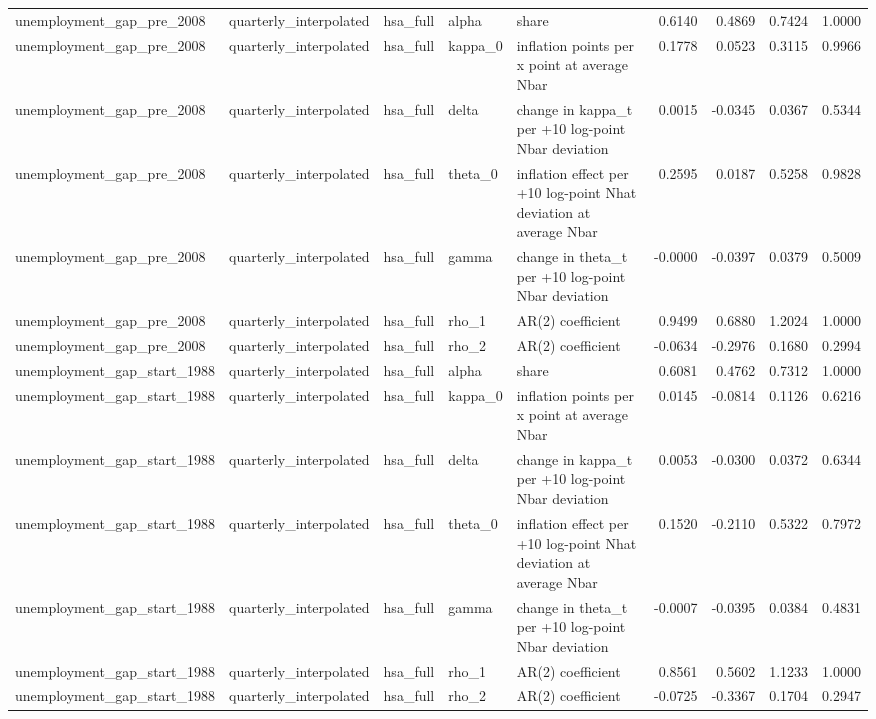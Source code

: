 \begin{tabular}{lllllrrrr}
unemployment\_gap\_pre\_2008 & quarterly\_interpolated & hsa\_full & alpha & share & 0.6140 & 0.4869 & 0.7424 & 1.0000 \\
unemployment\_gap\_pre\_2008 & quarterly\_interpolated & hsa\_full & kappa\_0 & inflation points per x point at average Nbar & 0.1778 & 0.0523 & 0.3115 & 0.9966 \\
unemployment\_gap\_pre\_2008 & quarterly\_interpolated & hsa\_full & delta & change in kappa\_t per +10 log-point Nbar deviation & 0.0015 & -0.0345 & 0.0367 & 0.5344 \\
unemployment\_gap\_pre\_2008 & quarterly\_interpolated & hsa\_full & theta\_0 & inflation effect per +10 log-point Nhat deviation at average Nbar & 0.2595 & 0.0187 & 0.5258 & 0.9828 \\
unemployment\_gap\_pre\_2008 & quarterly\_interpolated & hsa\_full & gamma & change in theta\_t per +10 log-point Nbar deviation & -0.0000 & -0.0397 & 0.0379 & 0.5009 \\
unemployment\_gap\_pre\_2008 & quarterly\_interpolated & hsa\_full & rho\_1 & AR(2) coefficient & 0.9499 & 0.6880 & 1.2024 & 1.0000 \\
unemployment\_gap\_pre\_2008 & quarterly\_interpolated & hsa\_full & rho\_2 & AR(2) coefficient & -0.0634 & -0.2976 & 0.1680 & 0.2994 \\
unemployment\_gap\_start\_1988 & quarterly\_interpolated & hsa\_full & alpha & share & 0.6081 & 0.4762 & 0.7312 & 1.0000 \\
unemployment\_gap\_start\_1988 & quarterly\_interpolated & hsa\_full & kappa\_0 & inflation points per x point at average Nbar & 0.0145 & -0.0814 & 0.1126 & 0.6216 \\
unemployment\_gap\_start\_1988 & quarterly\_interpolated & hsa\_full & delta & change in kappa\_t per +10 log-point Nbar deviation & 0.0053 & -0.0300 & 0.0372 & 0.6344 \\
unemployment\_gap\_start\_1988 & quarterly\_interpolated & hsa\_full & theta\_0 & inflation effect per +10 log-point Nhat deviation at average Nbar & 0.1520 & -0.2110 & 0.5322 & 0.7972 \\
unemployment\_gap\_start\_1988 & quarterly\_interpolated & hsa\_full & gamma & change in theta\_t per +10 log-point Nbar deviation & -0.0007 & -0.0395 & 0.0384 & 0.4831 \\
unemployment\_gap\_start\_1988 & quarterly\_interpolated & hsa\_full & rho\_1 & AR(2) coefficient & 0.8561 & 0.5602 & 1.1233 & 1.0000 \\
unemployment\_gap\_start\_1988 & quarterly\_interpolated & hsa\_full & rho\_2 & AR(2) coefficient & -0.0725 & -0.3367 & 0.1704 & 0.2947 \\

\end{tabular}
